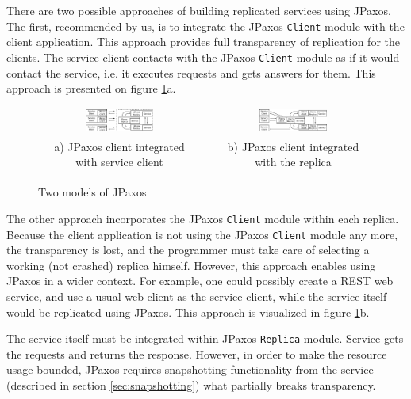 There are two possible approaches of building replicated services using JPaxos.
The first, recommended by us, is to integrate the JPaxos \texttt{Client}
module with the client application.  This approach provides full transparency of
replication for the clients. The service client contacts with the JPaxos
\texttt{Client} module as if it would contact the service, i.e. it executes
requests and gets answers for them. This approach is presented on figure
\ref{fig:jpaxos_processes}a.

\begin{figure}[h]
 \begin{tabular}{ccc}
  \includegraphics[width=0.45\textwidth]{architecture/userArchitecture1.pdf}
  &
  \hspace{0.01\textwidth}
  &
  \includegraphics[width=0.45\textwidth]{architecture/userArchitecture2.pdf}
  \\ 
  \scriptsize a) JPaxos client integrated with service client
  & & 
  \scriptsize b) JPaxos client integrated with the replica\\
 \end{tabular}
 \caption{Two models of JPaxos}\label{fig:jpaxos_processes}
\end{figure}

The other approach incorporates the JPaxos \texttt{Client} module within
each replica. Because the client application is not using the JPaxos \texttt{Client}
module any more, the transparency is lost, and the programmer must
take care of selecting a working (not crashed) replica himself. However, this
approach enables using JPaxos in a wider context. For example, one could
possibly create a REST web service, and use a usual web client as the service
client, while the service itself would be replicated using JPaxos. This
approach is visualized in figure \ref{fig:jpaxos_processes}b.

The service itself must be integrated within JPaxos \texttt{Replica} module. Service gets the requests and returns the response. However, in order to make the resource usage bounded, JPaxos requires snapshotting functionality from the service (described in section \ref{sec:snapshotting})
what partially breaks transparency. 

